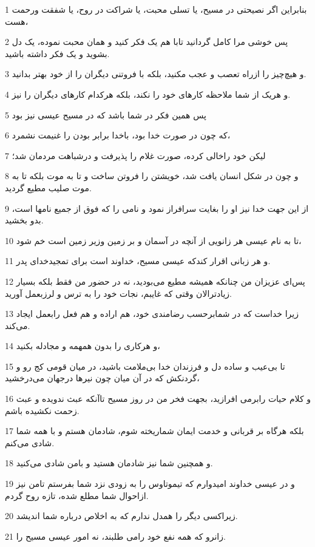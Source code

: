 \par 1 بنابراین اگر نصیحتی در مسیح، یا تسلی محبت، یا شراکت در روح، یا شفقت ورحمت هست،
\par 2 پس خوشی مرا کامل گردانید تابا هم یک فکر کنید و همان محبت نموده، یک دل بشوید و یک فکر داشته باشید.
\par 3 و هیچ‌چیز را ازراه تعصب و عجب مکنید، بلکه با فروتنی دیگران را از خود بهتر بدانید.
\par 4 و هریک از شما ملاحظه کارهای خود را نکند، بلکه هرکدام کارهای دیگران را نیز.
\par 5 پس همین فکر در شما باشد که در مسیح عیسی نیز بود
\par 6 که چون در صورت خدا بود، باخدا برابر بودن را غنیمت نشمرد،
\par 7 لیکن خود راخالی کرده، صورت غلام را پذیرفت و درشباهت مردمان شد؛
\par 8 و چون در شکل انسان یافت شد، خویشتن را فروتن ساخت و تا به موت بلکه تا به موت صلیب مطیع گردید.
\par 9 از این جهت خدا نیز او را بغایت سرافراز نمود و نامی را که فوق از جمیع نامها است، بدو بخشید.
\par 10 تا به نام عیسی هر زانویی از آنچه در آسمان و بر زمین وزیر زمین است خم شود،
\par 11 و هر زبانی اقرار کندکه عیسی مسیح، خداوند است برای تمجیدخدای پدر.
\par 12 پس‌ای عزیزان من چنانکه همیشه مطیع می‌بودید، نه در حضور من فقط بلکه بسیار زیادترالان وقتی که غایبم، نجات خود را به ترس و لرزبعمل آورید.
\par 13 زیرا خداست که در شمابرحسب رضامندی خود، هم اراده و هم فعل رابعمل ایجاد می‌کند.
\par 14 و هرکاری را بدون همهمه و مجادله بکنید،
\par 15 تا بی‌عیب و ساده دل و فرزندان خدا بی‌ملامت باشید، در میان قومی کج رو و گردنکش که در آن میان چون نیرها درجهان می‌درخشید،
\par 16 و کلام حیات رابرمی افرازید، بجهت فخر من در روز مسیح تاآنکه عبث ندویده و عبث زحمت نکشیده باشم.
\par 17 بلکه هرگاه بر قربانی و خدمت ایمان شماریخته شوم، شادمان هستم و با همه شما شادی می‌کنم.
\par 18 و همچنین شما نیز شادمان هستید و بامن شادی می‌کنید.
\par 19 و در عیسی خداوند امیدوارم که تیموتاوس را به زودی نزد شما بفرستم تامن نیز ازاحوال شما مطلع شده، تازه روح گردم.
\par 20 زیراکسی دیگر را همدل ندارم که به اخلاص درباره شما اندیشد.
\par 21 زانرو که همه نفع خود رامی طلبند، نه امور عیسی مسیح را.
